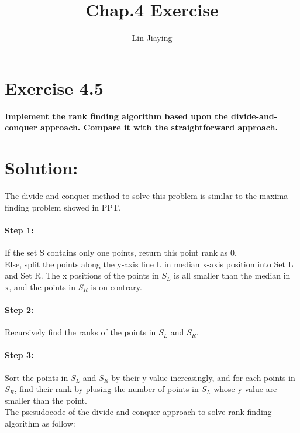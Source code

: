 \documentclass{article}
\author{Lin Jiaying}
\title{Chap.4 Exercise}
\begin{document}
	\maketitle
\section{Exercise 4.5}
\textbf{Implement the rank finding algorithm based upon the divide-and-conquer approach. Compare it with the straightforward approach.}

\section{Solution: }

	The divide-and-conquer method to solve this problem is similar to the maxima finding problem showed in PPT. 
	
	\paragraph{Step 1:}
	If the set S contains only one points, return this point rank as 0.\\	
	Else, split the points along the y-axis line L in median x-axis position into Set L and Set R. The x positions of the points in $S_L$ is all smaller than the median in x, and the points in $S_R$ is on contrary.
	\paragraph{Step 2:}
	Recursively find the ranks of the points in $S_L$ and $S_R$.
	\paragraph{Step 3:}
	Sort the points in $S_L$ and $S_R$ by their y-value increasingly, and for each points in $S_R$, find their rank by plusing the number of points in $S_L$ whose y-value are smaller than the point.\\
	
	
	The psesudocode of the divide-and-conquer approach to solve rank finding algorithm as follow:\\
	
	\newpage
	
\end{document}

